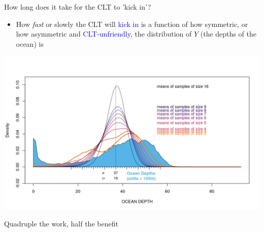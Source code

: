 \documentclass[10pt]{beamer}\usepackage[]{graphicx}\usepackage[]{color}
\begin{document}
\begin{frame}[fragile]{How long does it take for the CLT to 'kick in'?}
	\begin{itemize}
		\item How \textit{fast} or slowly the CLT will \textcolor{blue}{kick in} is a function of how symmetric, or how asymmetric and \textcolor{blue}{CLT-unfriendly}, the distribution of $Y$ (the depths of the ocean) is
	\end{itemize}
	
	
	\includegraphics[width=\textwidth,height=0.8\textheight,keepaspectratio]{oceanAll.png}
\end{frame}



\begin{frame}[fragile]{Quadruple the work, half the benefit}
	
\end{frame}
\end{document}
